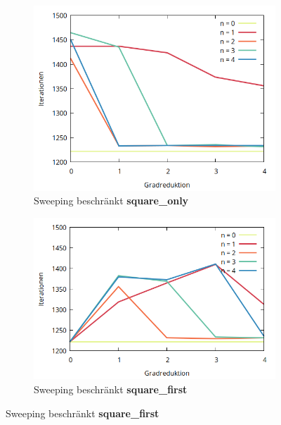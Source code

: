 \begin{figure}[tbh]
\centering
\begin{subfigure}{.5\textwidth}
  \centering
  \includegraphics[width=\linewidth]{img/sweeping_only.png}  
  \caption{Sweeping beschränkt \textbf{square\_only}}
  \label{fig:sub1}
\end{subfigure}%
\begin{subfigure}{.5\textwidth}
  \centering
  \includegraphics[width=\linewidth]{img/sweeping_first.png}
 \caption{Sweeping beschränkt \textbf{square\_first}}
  \label{fig:sub2}
\end{subfigure}


\end{figure}
